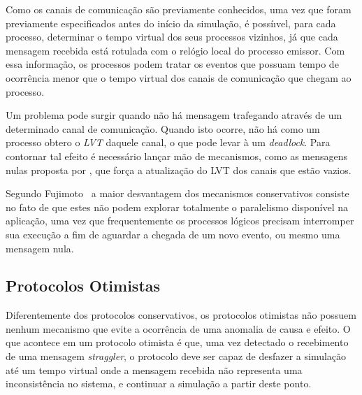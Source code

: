 Como os canais de comunicação são previamente conhecidos, uma vez que foram previamente especificados antes do início da simulação, é possíıvel, para cada processo, determinar o tempo virtual dos seus processos vizinhos, já que cada mensagem recebida está rotulada com o relógio local do processo emissor. Com essa informação, os processos podem tratar os eventos que possuam tempo de ocorrência menor que o tempo virtual dos canais de comunicação que chegam ao processo.



Um problema pode surgir quando não há mensagem trafegando através de um determinado canal de comunicação. Quando isto ocorre, não há como um processo obtero o \textit{LVT} daquele canal, o que pode levar à um \textit{deadlock}. Para contornar tal efeito é necessário lançar mão de mecanismos, como as mensagens nulas proposta por \cite{CMB1}, que força a atualização do LVT dos canais que estão vazios.


Segundo Fujimoto~\cite{FUJIMOTO} a maior desvantagem dos mecanismos conservativos consiste no fato de que estes não podem explorar totalmente o paralelismo disponível na aplicação, uma vez que frequentemente os processos lógicos precisam interromper sua execução a fim de aguardar a chegada de um novo evento, ou mesmo uma mensagem nula.

\subsection{Protocolos Otimistas}


Diferentemente dos protocolos conservativos, os protocolos otimistas não possuem nenhum mecanismo que evite a ocorrência de uma anomalia de causa e efeito. O que acontece em um protocolo otimista é que, uma vez detectado o recebimento de uma mensagem \textit{straggler}, o protocolo deve ser capaz de desfazer a simulação até um tempo virtual onde a mensagem recebida não representa uma inconsistência no sistema, e continuar a simulação a partir deste ponto.

